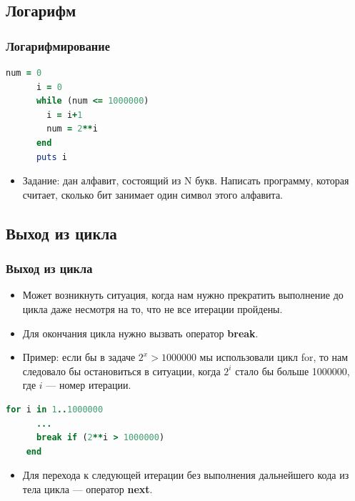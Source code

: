 \documentclass[compress,red]{beamer}
\begin{document}
\subsection{Логарифм}
\begin{frame}[fragile]
  \frametitle{Логарифмирование}

    \begin{lstlisting}[language=ruby,numbersep=2pt,label=ruby9,caption=Вычисление наименьшей степени]
      num = 0
      i = 0
      while (num <= 1000000)
        i = i+1
        num = 2**i
      end
      puts i
    \end{lstlisting}
    \begin{itemize}
      \item Задание: дан алфавит, состоящий из N букв. Написать программу, которая считает, сколько бит занимает один символ этого алфавита.
    \end{itemize}
\end{frame}

\subsection{Выход из цикла}
\begin{frame}[fragile]
  \frametitle{Выход из цикла}
  \begin{itemize}
    \item Может возникнуть ситуация, когда нам нужно прекратить выполнение до цикла даже несмотря на то, что не все итерации пройдены.
    \item Для окончания цикла нужно вызвать оператор \textbf{break}.
    \item Пример: если бы в задаче $2^x > 1000000$ мы использовали цикл for, то нам следовало бы остановиться в ситуации, когда $2^i$ стало бы больше 1000000, где $i$ --- номер итерации.
  \end{itemize} 
  \begin{lstlisting}[language=ruby,basicstyle=\footnotesize,numbersep=2pt,label=ruby11,caption=Break]
    for i in 1..1000000
      ...
      break if (2**i > 1000000)
    end
  \end{lstlisting}
  \begin{itemize}
    \item Для перехода к следующей итерации без выполнения дальнейшего кода из тела цикла --- оператор \textbf{next}.
  \end{itemize}
\end{frame}
\end{document}
